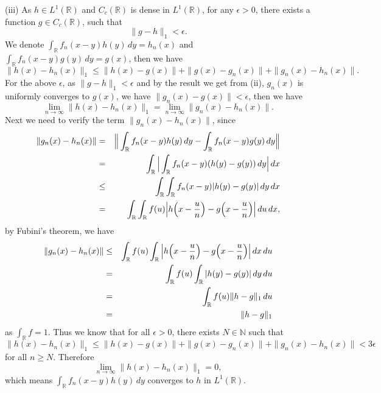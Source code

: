 \documentclass[12pt,a4paper]{ctexart}
\begin{document}
\vspace{4pt}

(iii) As $h \in L^{1}(\mathbb{R})$ and $C_{c} (\mathbb{R})$ is dense in $L^{1} (\mathbb{R})$, for any $\epsilon > 0$, there exists  a function $g \in C_{c}(\mathbb{R})$, such that
\begin{equation*}
    \|g - h\|_{1} < \epsilon.
\end{equation*}
We denote $\int_{\mathbb{R}}^{} f_{n} (x - y) h(y) \, d y = h_{n}(x)$ and $\int_{\mathbb{R}}^{} f_{n} (x - y) g(y) \, d y = g(x)$, then we have
\begin{equation*}
    \|h(x) - h_{n}(x)\|_{1} \leq \|h(x) - g(x)\| + \|g(x) - g_{n}(x)\| + \|g_{n}(x) - h_{n}(x)\|.
\end{equation*}
For the above $\epsilon$, as $\|g - h\|_{1} < \epsilon$ and by the result we get from (ii), $g_{n}(x)$ is uniformly converges to $g(x)$, we have $\|g_{n}(x) - g(x)\| < \epsilon$, then we have
\begin{equation*}
    \lim_{n \to \infty} \|h(x) - h_{n}(x)\|_{1} = \lim_{n \to \infty} \|g_{n}(x) - h_{n}(x)\|.
\end{equation*}
Next we need to verify the term $\|g_{n}(x) - h_{n}(x)\|$, since
\begin{eqnarray*}
    \|g_{n}(x) - h_{n}(x)\| & = & \Big{\|} \int_{\mathbb{R}}^{} f_{n} (x - y) h(y) \, d y - \int_{\mathbb{R}}^{} f_{n} (x - y) g(y) \, d y \Big{\|} \\
    & = & \int_{\mathbb{R}}^{} \Big{|}  \int_{\mathbb{R}}^{} f_{n} (x - y) ( h(y) - g(y)) \, d y \Big{|} \, d x \\
    & \leq & \int_{\mathbb{R}}^{} \int_{\mathbb{R}}^{} f_{n} (x - y) | h(y) - g(y)| \, d y \, d x \\
    & = & \int_{\mathbb{R}}^{} \int_{\mathbb{R}}^{} f (u) \Big{|} h \Big{(} x - \frac{u}{n} \Big{)} - g \Big{(} x - \frac{u}{n} \Big{)} \Big{|} \, d u \, d x,
\end{eqnarray*}
by Fubini's theorem, we have
\begin{eqnarray*}
    \|g_{n}(x) - h_{n}(x)\| & \leq & \int_{\mathbb{R}}^{} f (u)  \int_{\mathbb{R}}^{}  \Big{|} h \Big{(} x - \frac{u}{n} \Big{)} - g \Big{(} x - \frac{u}{n} \Big{)} \Big{|} \, d x \, d u \\
    & = & \int_{\mathbb{R}}^{} f (u)  \int_{\mathbb{R}}^{}  |h(y) - g(y)| \, d y \, d u \\
    & = & \int_{\mathbb{R}}^{} f (u)  \|h - g\|_{1} \, d u \\
    & = & \|h - g\|_1
\end{eqnarray*}
as $\int_{\mathbb R } f = 1$. Thus we know that for all $\epsilon > 0$, there exists $N \in \mathbb N$ such that
\begin{equation*}
    \|h(x) - h_{n}(x)\|_{1} \leq \|h(x) - g(x)\| + \|g(x) - g_{n}(x)\| + \|g_{n}(x) - h_{n}(x)\| < 3 \epsilon
\end{equation*}
for all $n \geq N$. Therefore
\begin{equation*}
    \lim_{n \to \infty} \|h(x) - h_{n}(x)\|_{1} = 0,
\end{equation*}
which means $\int_{\mathbb{R}}^{} f_{n} (x - y) h(y) \, d y$ converges to $h$ in $L^{1}(\mathbb{R})$.
\end{document}
